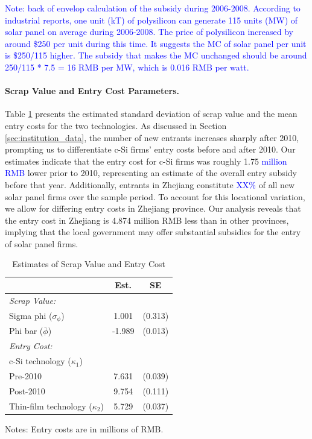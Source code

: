 \documentclass[12pt, letter]{article}
\begin{document}
\textcolor{blue}{Note: back of envelop calculation of the subsidy during 2006-2008. According to industrial reports, one unit (kT) of polysilicon can generate 115 units (MW) of solar panel on average during 2006-2008. The price of polysilicon increased by around \$250 per unit during this time. It suggests the MC of solar panel per unit is \$250/115 higher. The subsidy that makes the MC unchanged should be around 250/115 * 7.5 = 16 RMB per MW, which is 0.016 RMB per watt. }

\paragraph{Scrap Value and Entry Cost Parameters.}
Table \ref{tab:est_dyn_para_2} presents the estimated standard deviation of scrap value and the mean entry costs for the two technologies. As discussed in Section \ref{sec:institution_data}, the number of new entrants increases sharply after 2010, prompting us to differentiate c-Si firms' entry costs before and after 2010. Our estimates indicate that the entry cost for c-Si firms was roughly 1.75 \textcolor{blue}{million RMB} lower prior to 2010, representing an estimate of the overall entry subsidy before that year.
Additionally, entrants in Zhejiang constitute \textcolor{blue}{XX\%} of all new solar panel firms over the sample period. To account for this locational variation, we allow for differing entry costs in Zhejiang province. Our analysis reveals that the entry cost in Zhejiang is 4.874 million RMB less than in other provinces, implying that the local government may offer substantial subsidies for the entry of solar panel firms.

\begin{table}[!h]
\centering
\caption{Estimates of Scrap Value and Entry Cost}
\label{tab:est_dyn_para_2}
\begin{threeparttable}
\begin{tabularx}{0.75\textwidth}{Xcc}
\toprule
 & Est. & SE  \\
\midrule
\multicolumn{3}{l}{\textit{Scrap Value:}} \\
\quad Sigma phi ($\sigma_{\phi}$) & 1.001 & (0.313) \\
\quad Phi bar ($\bar{\phi}$) &  -1.989& (0.013) \\
\multicolumn{3}{l}{\textit{Entry Cost:}} \\
\quad c-Si technology ($\kappa_{1}$) & & \\
\qquad Pre-2010 & 7.631 & (0.039) \\
\qquad Post-2010 & 9.754 & (0.111) \\
\quad Thin-film technology ($\kappa_{2}$) &   5.729 & (0.037) \\
\bottomrule
\end{tabularx}
\begin{tablenotes}
  \item Notes: Entry costs are in millions of RMB.
\end{tablenotes}
\end{threeparttable}
\end{table}
\end{document}
